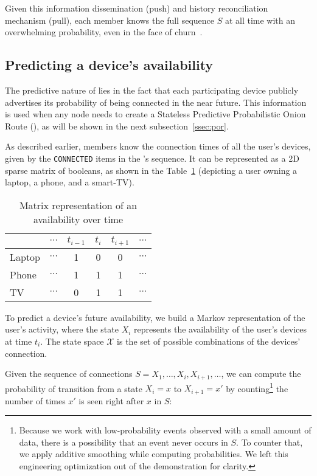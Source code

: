 Given this information dissemination (push) and history reconciliation mechanism (pull), each \squad member knows the full sequence $S$ at all time with an overwhelming probability, even in the face of churn~\cite{luxey:cascade}.

\subsection{Predicting a device's availability}
\label{ssec:device_availability}

The predictive nature of \name lies in the fact that each participating device publicly advertises its probability of being connected in the near future. 
This information is used when any node needs to create a Stateless Predictive Probabilistic Onion Route (\SPOR), as will be shown in the next subsection~\ref{ssec:por}.

As described earlier, \squad members know the connection times of all the user's devices, given by the \texttt{CONNECTED} items in the \squad's sequence.
It can be represented as a 2D sparse matrix of booleans, as shown in the Table~\ref{tab:connection_times} (depicting a user owning a laptop, a phone, and a smart-TV).


\begin{table}
\caption{Matrix representation of an \squad availability over time}
\centering
\begin{tabular}{@{}lccccc@{}} \toprule
		& $\cdots$	& $t_{i-1}$	& $t_i$		& $t_{i+1}$	& $\cdots$ \\ \midrule
Laptop	& $\cdots$	& 1			& 0			& 0			& $\cdots$ \\
Phone	& $\cdots$	& 1			& 1			& 1			& $\cdots$ \\
TV		& $\cdots$	& 0			& 1			& 1			& $\cdots$ \\ \bottomrule
\end{tabular}
\label{tab:connection_times}
\end{table}

To predict a device's future availability, we build a Markov representation of the user's activity, 
where the state $X_i$ represents the availability of the user's devices at time $t_i$.
The state space $\mathcal{X}$ is the set of possible combinations of the devices' connection.

Given the \squad sequence of connections $S = X_1, \dots, X_i, X_{i+1}, \dots$,
we can compute the probability of transition from a state $X_i=x$ to $X_{i+1}=x'$ by counting\footnote{%
	Because we work with low-probability events observed with a small amount of data, there is a possibility that an event never occurs in $S$. 
	To counter that, we apply additive smoothing while computing probabilities. 
	We left this engineering optimization out of the demonstration for clarity.
} the number of times $x'$ is seen right after $x$ in $S$:

